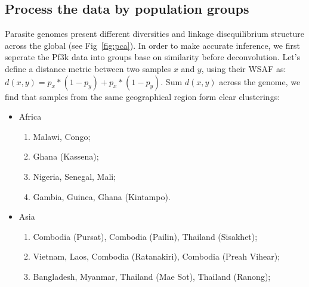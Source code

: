 \documentclass{article}
\begin{document}
\subsection{Process the data by population groups}

Parasite genomes present different diversities and linkage disequilibrium structure across the global (see Fig~\ref{fig:pca}). In order to make accurate inference, we first seperate the Pf3k data into groups base on similarity before deconvolution. Let's define a distance metric between two samples $x$ and $y$, using their WSAF as:
$d(x, y) = p_{x} * (1-p_{y}) + p_{x} * (1-p_{y})$. Sum $d(x, y)$ across the genome, we find that samples from the same geographical region form clear clusterings:
\linespread{1}
\begin{itemize}
\item Africa
\begin{enumerate}
\item Malawi, Congo;
\item Ghana (Kassena);
\item Nigeria, Senegal, Mali;
\item Gambia, Guinea, Ghana (Kintampo).
\end{enumerate}
\item Asia
\begin{enumerate}
\item Combodia (Pursat), Combodia (Pailin), Thailand (Sisakhet);
\item Vietnam, Laos, Combodia (Ratanakiri), Combodia (Preah Vihear);
\item Bangladesh, Myanmar, Thailand (Mae Sot), Thailand (Ranong);
\end{enumerate}
\end{itemize}
\linespread{1.5}
\end{document}
